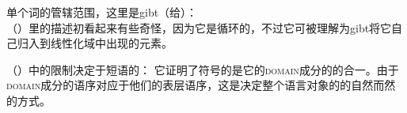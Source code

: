 \ea
单个词的管辖范围，这里是gibt（给）：\\
 
\z
（）里的描述初看起来有些奇怪，因为它是循环的，不过它可被理解为gibt将它自己归入到线性化域中出现的元素。

（）中的限制决定于短语的\phonvsc ：
\ea
{} \impl
{}
\z
它证明了符号的\phonvc 是它的\textsc{domain}成分的\phonvsc 的合一。由于\textsc{domain}成分的语序对应于他们的表层语序，这是决定整个语言对象的\phonvc 的自然而然的方式。


